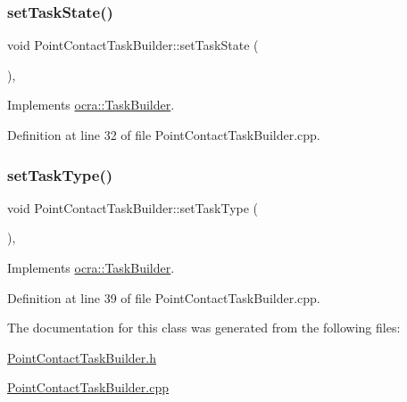 \hypertarget{classocra_1_1PointContactTaskBuilder_a073506c0c849ad4ebd40aebef37f280d}{}\label{classocra_1_1PointContactTaskBuilder_a073506c0c849ad4ebd40aebef37f280d} 
\subsubsection{\texorpdfstring{set\+Task\+State()}{setTaskState()}}
{\footnotesize\ttfamily void Point\+Contact\+Task\+Builder\+::set\+Task\+State (\begin{DoxyParamCaption}{ }\end{DoxyParamCaption})\hspace{0.3cm}{\ttfamily [protected]}, {\ttfamily [virtual]}}



Implements \hyperlink{classocra_1_1TaskBuilder_a7b44bfa101566ea4400e2d9bfdb9ff32}{ocra\+::\+Task\+Builder}.



Definition at line 32 of file Point\+Contact\+Task\+Builder.\+cpp.

\hypertarget{classocra_1_1PointContactTaskBuilder_a88d7c619f00708c1b3472ee7dc373f96}{}\label{classocra_1_1PointContactTaskBuilder_a88d7c619f00708c1b3472ee7dc373f96} 
\subsubsection{\texorpdfstring{set\+Task\+Type()}{setTaskType()}}
{\footnotesize\ttfamily void Point\+Contact\+Task\+Builder\+::set\+Task\+Type (\begin{DoxyParamCaption}{ }\end{DoxyParamCaption})\hspace{0.3cm}{\ttfamily [protected]}, {\ttfamily [virtual]}}



Implements \hyperlink{classocra_1_1TaskBuilder_a1a979fc495be6dc30483aa8fd0ff2650}{ocra\+::\+Task\+Builder}.



Definition at line 39 of file Point\+Contact\+Task\+Builder.\+cpp.



The documentation for this class was generated from the following files\+:\begin{DoxyCompactItemize}
\item 
\hyperlink{PointContactTaskBuilder_8h}{Point\+Contact\+Task\+Builder.\+h}\item 
\hyperlink{PointContactTaskBuilder_8cpp}{Point\+Contact\+Task\+Builder.\+cpp}\end{DoxyCompactItemize}
